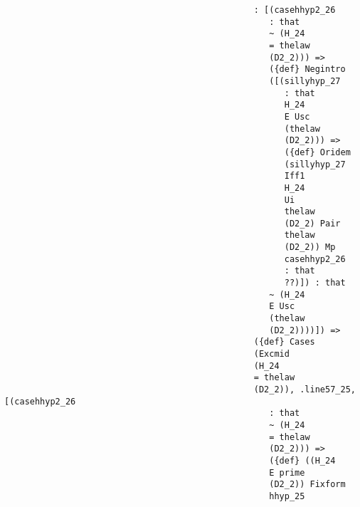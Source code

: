 \documentclass[12pt]{article}
\begin{document}
\begin{verbatim}
                                                 : [(casehhyp2_26 
                                                    : that 
                                                    ~ (H_24 
                                                    = thelaw 
                                                    (D2_2))) => 
                                                    ({def} Negintro 
                                                    ([(sillyhyp_27 
                                                       : that 
                                                       H_24 
                                                       E Usc 
                                                       (thelaw 
                                                       (D2_2))) => 
                                                       ({def} Oridem 
                                                       (sillyhyp_27 
                                                       Iff1 
                                                       H_24 
                                                       Ui 
                                                       thelaw 
                                                       (D2_2) Pair 
                                                       thelaw 
                                                       (D2_2)) Mp 
                                                       casehhyp2_26 
                                                       : that 
                                                       ??)]) : that 
                                                    ~ (H_24 
                                                    E Usc 
                                                    (thelaw 
                                                    (D2_2))))]) => 
                                                 ({def} Cases 
                                                 (Excmid 
                                                 (H_24 
                                                 = thelaw 
                                                 (D2_2)), .line57_25, [(casehhyp2_26 
                                                    : that 
                                                    ~ (H_24 
                                                    = thelaw 
                                                    (D2_2))) => 
                                                    ({def} ((H_24 
                                                    E prime 
                                                    (D2_2)) Fixform 
                                                    hhyp_25 

\end{verbatim}
\end{document}
